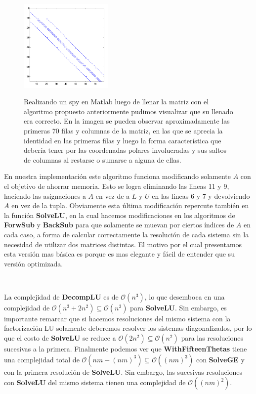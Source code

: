 \begin{figure}
  \caption{ Realizando un spy en Matlab luego de llenar la matriz con el algoritmo propuesto anteriormente pudimos visualizar que su llenado era correcto. En la imagen se pueden observar aproximadamente las primeras 70 filas y columnas de la matriz, en las que se aprecia la identidad en las primeras filas y luego la forma caracter\'istica que deber\'ia tener por las coordenadas polares involucradas y sus saltos de columnas al restarse o sumarse a alguna de ellas.\newline\newline\newline\newline\newline\newline}
  \includegraphics[width=0.4\textwidth]{figures/spy.pdf}
  \label{compbench-glu}
\end{figure}

\newpage

En nuestra implementaci\'on este algoritmo funciona modificando solamente $A$ con el objetivo de ahorrar memoria. Esto se logra eliminando las lineas 11 y 9, haciendo las asignaciones a $A$ en vez de a $L$ y $U$ en las lineas 6 y 7 y devolviendo $A$ en vez de la tupla. Obviamente esta \'ultima modificaci\'on repercute tambi\'en en la funci\'on \textbf{SolveLU}, en la cual hacemos modificaciones en los algoritmos de \textbf{ForwSub} y \textbf{BackSub} para que solamente se muevan por ciertos \'indices de $A$ en cada caso, a forma de calcular correctamente la resoluci\'on de cada sistema sin la necesidad de utilizar dos matrices distintas. El motivo por el cual presentamos esta versi\'on mas b\'asica es porque es mas elegante y f\'acil de entender que su versi\'on optimizada.

~

La complejidad de \textbf{DecompLU} es de $\mathcal{O}(n^3)$, lo que desemboca en una complejidad de $\mathcal{O}(n^3 + 2n^2) \subseteq \mathcal{O}(n^3)$ para \textbf{SolveLU}. Sin embargo, es importante remarcar que si hacemos resoluciones del mismo sistema con la factorizaci\'on LU solamente deberemos resolver los sistemas diagonalizados, por lo que el costo de \textbf{SolveLU} se reduce a $\mathcal{O}(2n^2) \subseteq \mathcal{O}(n^2)$ para las resoluciones sucesivas a la primera. Finalmente podemos ver que \textbf{WithFifteenThetas} tiene una complejidad total de $\mathcal{O}(nm + (nm)^3) \subseteq \mathcal{O}((nm)^3)$ con \textbf{SolveGE} y con la primera resoluci\'on de \textbf{SolveLU}. Sin embargo, las sucesivas resoluciones con \textbf{SolveLU} del mismo sistema tienen una complejidad de $\mathcal{O}((nm)^2)$.

